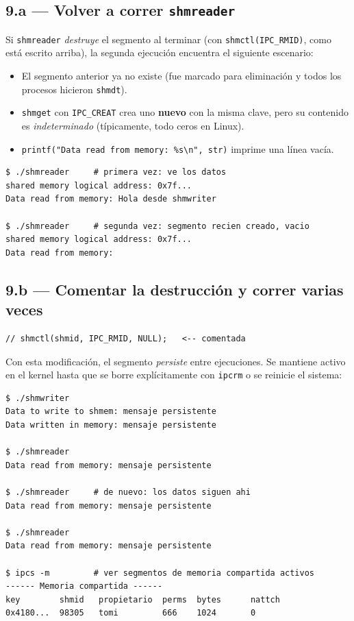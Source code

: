 \documentclass[11pt,a4paper]{article}
\begin{document}
\subsection{9.a --- Volver a correr \texttt{shmreader}}

Si \texttt{shmreader} \emph{destruye} el segmento al terminar (con
\texttt{shmctl(IPC\_RMID)}, como está escrito arriba), la segunda
ejecución encuentra el siguiente escenario:

\begin{itemize}[leftmargin=*,nosep]
    \item El segmento anterior ya no existe (fue marcado para
        eliminación y todos los procesos hicieron \texttt{shmdt}).
    \item \texttt{shmget} con \texttt{IPC\_CREAT} crea uno
        \textbf{nuevo} con la misma clave, pero su contenido es
        \emph{indeterminado} (típicamente, todo ceros en Linux).
    \item \texttt{printf("Data read from memory: \%s\textbackslash{}n",
        str)} imprime una línea vacía.
\end{itemize}

\begin{lstlisting}[style=shellstyle]
$ ./shmreader     # primera vez: ve los datos
shared memory logical address: 0x7f...
Data read from memory: Hola desde shmwriter

$ ./shmreader     # segunda vez: segmento recien creado, vacio
shared memory logical address: 0x7f...
Data read from memory:
\end{lstlisting}

\subsection{9.b --- Comentar la destrucción y correr varias veces}

\begin{lstlisting}[style=cstyle]
// shmctl(shmid, IPC_RMID, NULL);   <-- comentada
\end{lstlisting}

Con esta modificación, el segmento \emph{persiste} entre ejecuciones.
Se mantiene activo en el kernel hasta que se borre explícitamente con
\texttt{ipcrm} o se reinicie el sistema:

\begin{lstlisting}[style=shellstyle]
$ ./shmwriter
Data to write to shmem: mensaje persistente
Data written in memory: mensaje persistente

$ ./shmreader
Data read from memory: mensaje persistente

$ ./shmreader     # de nuevo: los datos siguen ahi
Data read from memory: mensaje persistente

$ ./shmreader
Data read from memory: mensaje persistente

$ ipcs -m         # ver segmentos de memoria compartida activos
------ Memoria compartida ------
key        shmid   propietario  perms  bytes      nattch
0x4180...  98305   tomi         666    1024       0
\end{lstlisting}
\end{document}

